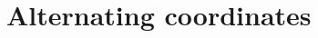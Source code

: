 \documentclass{llncs}
\def\mat#1{\begin{pmatrix}#1\end{pmatrix}}
\begin{document}
\section{Alternating coordinates}
\end{document}
